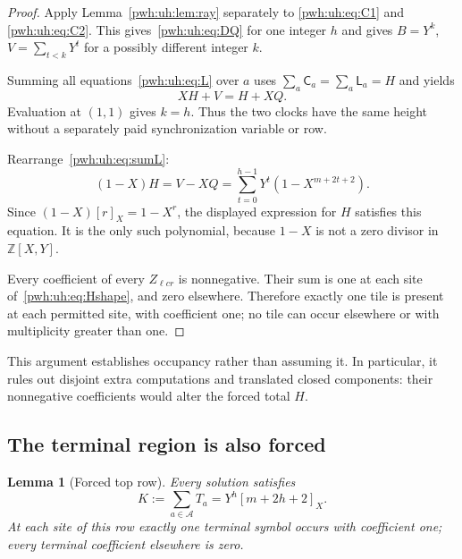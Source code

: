 \documentclass[11pt,letterpaper]{article}
\numberwithin{equation}{section}
\newtheorem{lemma}[theorem]{Lemma}
\theoremstyle{definition}
\newcommand{\Z}{\mathbb Z}
\newcommand{\A}{\mathcal A}
\newcommand{\rep}[1]{[#1]_X}
\newcommand{\LL}{\mathsf L}
\newcommand{\CC}{\mathsf C}
\begin{document}
\begin{proof}
Apply Lemma~\ref{pwh:uh:lem:ray} separately to \eqref{pwh:uh:eq:C1} and
\eqref{pwh:uh:eq:C2}. This gives~\eqref{pwh:uh:eq:DQ} for one integer $h$ and gives
$B=Y^k$, $V=\sum_{t<k}Y^t$ for a possibly different integer $k$.

Summing all equations~\eqref{pwh:uh:eq:L} over $a$ uses
$\sum_a\CC_a=\sum_a\LL_a=H$ and yields
\begin{equation}
 XH+V=H+XQ.
 \label{pwh:uh:eq:sumL}
\end{equation}
Evaluation at $(1,1)$ gives $k=h$. Thus the two clocks have the same
height without a separately paid synchronization variable or row.

Rearrange~\eqref{pwh:uh:eq:sumL}:
\[
 (1-X)H=V-XQ
  =\sum_{t=0}^{h-1}Y^t(1-X^{m+2t+2}).
\]
Since $(1-X)\rep{r}=1-X^r$, the displayed expression for $H$ satisfies
this equation. It is the only such polynomial, because $1-X$ is not a
zero divisor in $\Z[X,Y]$.

Every coefficient of every $Z_{\ell c r}$ is nonnegative. Their sum is
one at each site of~\eqref{pwh:uh:eq:Hshape}, and zero elsewhere. Therefore
exactly one tile is present at each permitted site, with coefficient one;
no tile can occur elsewhere or with multiplicity greater than one.
\end{proof}

This argument establishes occupancy rather than assuming it. In
particular, it rules out disjoint extra computations and translated closed
components: their nonnegative coefficients would alter the forced total
$H$.

\subsection{The terminal region is also forced}

\begin{lemma}[Forced top row]
\label{pwh:uh:lem:top}
Every solution satisfies
\begin{equation}
 K:=\sum_{a\in\A}T_a=Y^h\rep{m+2h+2}.
 \label{pwh:uh:eq:topshape}
\end{equation}
At each site of this row exactly one terminal symbol occurs with
coefficient one; every terminal coefficient elsewhere is zero.
\end{lemma}
\end{document}
